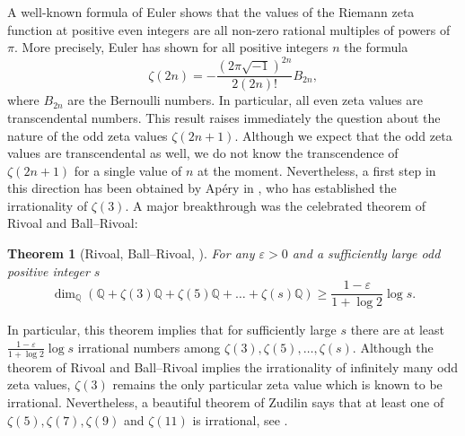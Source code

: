 \documentclass[12pt]{article}
\newtheorem*{theorem*}{Theorem}
\numberwithin{equation}{section}
\begin{document}
A well-known formula of Euler shows that the values of the Riemann zeta function at positive even integers are all non-zero rational multiples of powers of $\pi$. More precisely, Euler has shown for all positive integers $n$ the formula
\[
	\zeta(2n)= -\frac{(2\pi \sqrt{-1})^{2n}}{2(2n)!}B_{2n},
\]
where $B_{2n}$ are the Bernoulli numbers. In particular, all even zeta values are transcendental numbers. This result raises immediately the question about the nature of the odd zeta values $\zeta(2n+1)$. Although we expect that the odd zeta values are transcendental as well, we do not know the transcendence of $\zeta(2n+1)$ for a single value of $n$ at the moment. Nevertheless, a first step in this direction has been obtained by Ap\'ery in \cite{Ap79}, who has established the irrationality of $\zeta(3)$. A major breakthrough was the celebrated theorem of Rivoal and Ball--Rivoal:
\begin{theorem*}[Rivoal, Ball--Rivoal, \cite{Riv00,BR01}]
	For any $\varepsilon>0$ and a sufficiently large odd positive integer $s$
	\[
		\dim_{\mathbb{Q}} \left( \mathbb{Q}+ \zeta(3)\mathbb{Q}+ \zeta(5)\mathbb{Q}+\dots + \zeta(s)\mathbb{Q} \right)\geqslant \frac{1-\varepsilon}{1+\log 2} \log s.
	\]
\end{theorem*}
In particular, this theorem implies that for sufficiently large $s$ there are at least $\frac{1-\varepsilon}{1+\log 2} \log s$ irrational numbers among $\zeta(3),\zeta(5),\dots, \zeta(s)$. Although the theorem of Rivoal and Ball--Rivoal  implies the irrationality of infinitely many odd zeta values,  $\zeta(3)$ remains the only particular zeta value which is known to be irrational. Nevertheless, a beautiful theorem of Zudilin says that at least one of $\zeta(5),\zeta(7), \zeta(9)$ and $\zeta(11)$ is irrational, see \cite{Zud01}.
\end{document}
